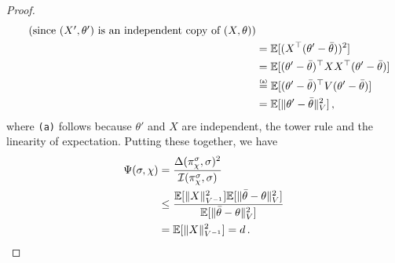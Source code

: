 \documentclass[letter, 12pt]{report}
\newcommand{\explan}[1]{\stackrel{\text{\tiny \texttt{#1}}}}
\newcommand{\E}{\mathbb E}
\newcommand{\I}{\mathcal{I}}
\newcommand{\1}{\mathbf{1}}
\theoremstyle{plain}
\theoremstyle{definition}
\theoremstyle{remark}
\begin{document}
\begin{proof}
\begin{align*}
        \tag{since $(X', \theta')$ is an independent copy of $(X, \theta)$}
        \\
         & =
        \E[(X^\top (\theta' - \bar{\theta}))^2]                             \\
         & =
        \E[(\theta' - \bar{\theta})^\top X X^\top (\theta' - \bar{\theta})] \\
         &
        \explan{(a)}
        =
        \E[(\theta' - \bar{\theta})^\top V (\theta' - \bar{\theta})]        \\
         & =
        \E[\|\theta' - \bar{\theta}\|_V^2]\,,
    \end{align*}
    where \texttt{(a)} follows because $\theta'$ and $X$ are independent,
    the tower rule and the linearity of expectation.
    Putting these together, we have
    \begin{align*}
        \Psi(\sigma, \chi)
         & =
        \frac{\Delta(\pi^\sigma_\chi, \sigma)^2}{\I(\pi^\sigma_\chi, \sigma)}
        \\
         & \leq
        \frac{
        \E[\|X\|^2_{V^{-1}}]
        \E[\|\bar{\theta} - \theta\|^2_{V}]
        }{
        \E[\|\bar{\theta} - \theta\|^2_{V}]
        }
        \\
         & =
        \E[\|X\|^2_{V^{-1}}]
        =d\,. \qedhere
    \end{align*}
\end{proof}
\end{document}

